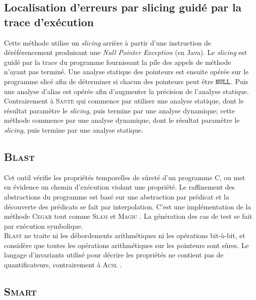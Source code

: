 \subsection{Localisation d'erreurs par slicing guidé par la trace d'exécution}

Cette méthode \cite{fault-localization} utilise un {\em slicing} arrière à
partir d'une instruction de déréférencement produisant une {\em Null Pointer
Exception} (en Java). Le {\em slicing} est guidé par la trace du programme
fournissant la pile des appels de méthode n'ayant pas terminé. Une analyse
statique des pointeurs est ensuite opérée sur le programme slicé afin de
déterminer si chacun des pointeurs peut être ${\tt NULL}$. Puis une analyse
d'alias est opérée afin d'augmenter la précision de l'analyse statique.\\

Contrairement à \textsc{Sante} \cite{SANTE} qui commence par utiliser une
analyse statique, dont le résultat paramètre le {\em slicing}, puis termine par
une analyse dynamique; cette méthode commence par une analyse dynamique, dont
le résultat paramètre le {\em slicing}, puis termine par une analyse statique.

\subsection{\textsc{Blast}}

Cet outil \cite{BLAST} vérifie les propriétés temporelles de sûreté d'un
programme C, ou met en évidence un chemin d'exécution violant une propriété. Le
raffinement des abstractions du programme est basé sur une abstraction par
prédicat et la découverte des prédicats se fait par interpolation. C'est une
implémentation de la méthode \textsc{Cegar} \cite{CEGAR} tout comme
\textsc{Slam} \cite{SLAM} et \textsc{Magic} \cite{MAGIC}. La génération des cas
de test se fait par exécution symbolique.\\

\textsc{Blast} ne traite ni les débordements arithmétiques ni les opérations
bit-à-bit, et considère que toutes les opérations arithmétiques sur les
pointeurs sont sûres. Le langage d'invariants utilisé pour décrire les
propriétés ne contient pas de quantificateurs, contrairement à \textsc{Acsl}
\cite{ACSL}.

\subsection{\textsc{Smart}}

